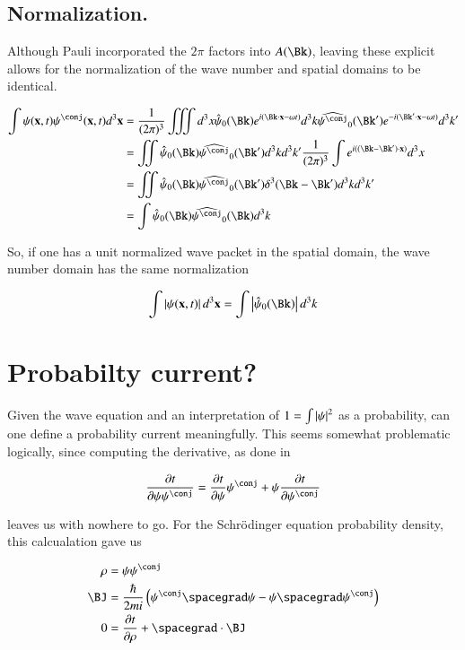 \documentclass{article}
\begin{document}
\subsection{ Normalization. }

Although Pauli incorporated the $2\pi$ factors into $A(\Bk)$, leaving these explicit allows for the normalization of the wave number and spatial domains
to be identical.

\begin{align*}
\int 
\psi(\Bx,t) \psi^\conj(\Bx,t) d^3 \Bx
&= 
\inv{({2\pi})^3}
\iiint d^3 x
\hat{\psi}_0(\Bk) e^{ i (\Bk \cdot \Bx - \omega t)} d^3 k
\widehat{\psi^\conj}_0(\Bk') e^{ -i (\Bk' \cdot \Bx - \omega t)} d^3 k' 
\\
&= 
\iint \hat{\psi}_0(\Bk) \widehat{\psi^\conj}_0(\Bk') 
d^3 k d^3 k'
\inv{({2\pi})^3} \int e^{ i ((\Bk- \Bk') \cdot \Bx)} d^3 x
\\
&= 
\iint \hat{\psi}_0(\Bk) \widehat{\psi^\conj}_0(\Bk') \delta^3(\Bk-\Bk') d^3 k d^3 k'
\\
&= 
\int \hat{\psi}_0(\Bk) \widehat{\psi^\conj}_0(\Bk) d^3 k 
\\
\end{align*}

So, if one has a unit normalized wave packet in the spatial domain, the wave number domain has the same normalization

\begin{align}
\int \Abs{\psi(\Bx,t)} d^3 \Bx = \int \Abs{\hat{\psi}_0(\Bk)} d^3 k 
\end{align}

\section{ Probabilty current? }

Given the wave equation and an interpretation of $1 = \int \left\lvert{\psi}\right\rvert^2$ as a probability, can one define a probability current meaningfully.  This
seems somewhat problematic logically, since computing the derivative, as done in \cite{PJprobCurrent}

\begin{align*}
\PD{t}{\psi\psi^\conj} = \PD{t}{\psi}\psi^\conj + \psi \PD{t}{\psi^\conj}
\end{align*}

leaves us with nowhere to go.  For the 
Schr\"{o}dinger equation probability density, this calcualation gave us

\begin{align}\label{eqn:pcons}
\rho &= \psi\psi^\conj \\
\BJ &= \frac{\hbar}{2mi} \left( \psi^\conj \spacegrad \psi - \psi \spacegrad \psi^\conj \right) \\
0 &= \PD{t}{\rho} + \spacegrad \cdot \BJ 
\end{align}
\end{document}
